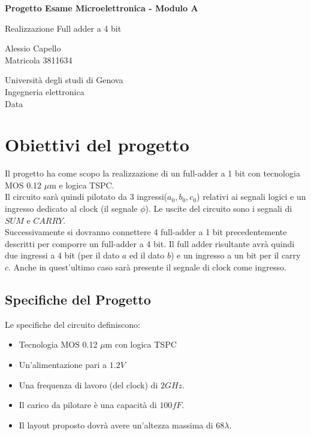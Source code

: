 \documentclass[12pt]{article} %
\begin{document}
\begin{center}
       \vspace*{1cm}
 
       \Large{\textbf{Progetto Esame Microelettronica - Modulo A}}
 
       \vspace{0.5cm}
        Realizzazione Full adder a 4 bit
 
       \vspace{1.5cm}
 
       Alessio Capello\\
 
       Matricola 3811634
 
       \vspace{1.5cm}
 
 
       Università degli studi di Genova\\
       Ingegneria elettronica\\
       Data   
\end{center}
\clearpage

\tableofcontents

\clearpage

\section{Obiettivi del progetto}
Il progetto ha come scopo la realizzazione di un full-adder a 1 bit con tecnologia MOS 0.12 $\mu$m e logica TSPC. \\
Il circuito sarà quindi pilotato da 3 ingressi($a_{0},b_{0}, c_{0}$) relativi ai segnali logici e un ingresso dedicato al clock (il segnale $\phi$).
Le uscite del circuito sono i segnali di $SUM$ e $CARRY$.\\
Successivamente si dovranno connettere 4 full-adder a 1 bit precedentemente descritti per comporre un full-adder a 4 bit.
Il full adder risultante avrà quindi due ingressi a 4 bit (per il dato $a$ ed il dato $b$) e un ingresso a un bit per il carry $c$. Anche in quest'ultimo caso sarà presente il segnale di clock come ingresso.
\subsection{Specifiche del Progetto}
Le specifiche del circuito definiscono:
\begin{itemize}
\item Tecnologia MOS 0.12 $\mu$m con logica TSPC
\item Un'alimentazione  pari a $1.2V$ 
\item Una frequenza di lavoro (del clock) di $2GHz$. 
\item Il carico da pilotare è una capacità di $100fF$.
\item Il layout proposto dovrà avere un'altezza massima di 68$\lambda$.
\end{itemize}
\end{document}
